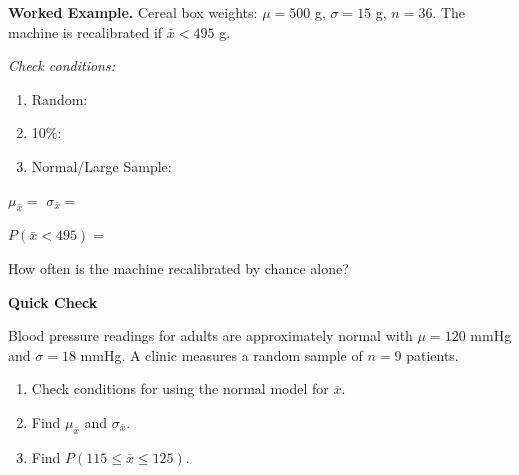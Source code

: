\documentclass[10pt]{article}
\begin{document}
\begin{notesbox}
\textbf{Worked Example.} Cereal box weights: $\mu = 500$ g, $\sigma = 15$ g, $n = 36$.
The machine is recalibrated if $\bar{x} < 495$ g.

\medskip
\textit{Check conditions:}
\begin{enumerate}
  \item Random: 
  \item 10\%: 
  \item Normal/Large Sample: 
\end{enumerate}

$\mu_{\bar{x}} = $ \blank{0.5in} \hspace{1cm} $\sigma_{\bar{x}} = $ \blank{1.2in}

\medskip
$P(\bar{x} < 495) = $ 

How often is the machine recalibrated by chance alone? 
\end{notesbox}

\begin{practicebox}
\textbf{Quick Check}

Blood pressure readings for adults are approximately normal with $\mu = 120$ mmHg and
$\sigma = 18$ mmHg. A clinic measures a random sample of $n = 9$ patients.
\begin{enumerate}
  \item Check conditions for using the normal model for $\bar{x}$.
  \item Find $\mu_{\bar{x}}$ and $\sigma_{\bar{x}}$.
        \vspace{0.5in}
  \item Find $P(115 \le \bar{x} \le 125)$.
        \vspace{0.8in}
\end{enumerate}
\end{practicebox}
\end{document}
